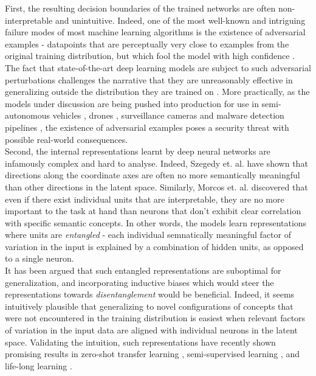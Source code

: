 \documentclass{report}
\begin{document}
\noindent First, the resulting decision boundaries of the trained networks are often non-interpretable and unintuitive. Indeed, one of the most well-known and intriguing failure modes of most machine learning algorithms is the existence of adversarial examples - datapoints that are perceptually very close to examples from the original training distribution, but which fool the model with high confidence \cite{intriguing-properties}. The fact that state-of-the-art deep learning models are subject to such adversarial perturbations challenges the narrative that they are unreasonably effective in generalizing outside the distribution they are trained on \cite{bengio-deep-architectures}. More practically, as the models under discussion are being pushed into production for use in semi-autonomous vehicles \cite{nvidia-self-driving-cars}, drones \cite{drones}, surveillance cameras \cite{surveillance-cameras} and malware detection pipelines \cite{malware}, the existence of adversarial examples poses a security threat with possible real-world consequences. \\

\noindent Second, the internal representations learnt by deep neural networks are infamously complex and hard to analyse. Indeed, Szegedy et. al. \cite{intriguing-properties} have shown that directions along the coordinate axes are often no more semantically meaningful than other directions in the latent space. Similarly, Morcos et. al. \cite{importance-single-directions} discovered that even if there exist individual units that are interpretable, they are no more important to the task at hand than neurons that don't exhibit clear correlation with specific semantic concepts. In other words, the models learn representations where units are \textit{entangled} - each individual semnatically meaningful factor of variation in the input is explained by a combination of hidden units, as opposed to a single neuron. \\

\noindent It has been argued \cite{bengio-representation} that such entangled representations are suboptimal for generalization, and incorporating inductive biases which would steer the representations towards \textit{disentanglement} would be beneficial. Indeed, it seems intuitively plausible that generalizing to novel configurations of concepts that were not encountered in the training distribution is easiest when relevant factors of variation in the input data are aligned with individual neurons in the latent space. Validating the intuition, such representations have recently shown promising results in zero-shot transfer learning \cite{darla}, semi-supervised learning \cite{dgpose}, and life-long learning \cite{vase}. \\
\end{document}
